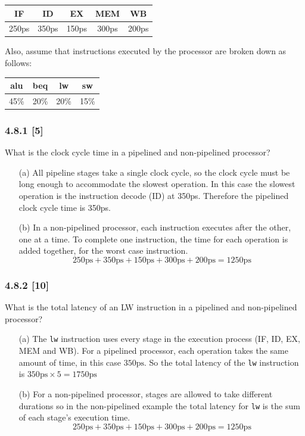 \documentclass[fleqn]{article}
\begin{document}
\begin{table}[H]
    \centering
    \begin{tabular}{|c|c|c|c|c|}
    \hline
    \rowcolor[HTML]{79bde8} 
    IF & ID & EX & MEM & WB \\ \hline \hline
    250ps & 350ps & 150ps & 300ps & 200ps \\ \hline
    \end{tabular}
\end{table}

Also, assume that instructions executed by the processor are broken down as follows:
\begin{table}[H]
    \centering
    \begin{tabular}{|c|c|c|c|}
    \hline
    \rowcolor[HTML]{79bde8} 
    alu & beq & lw & sw  \\ \hline \hline
    45\% & 20\% & 20\% & 15\% \\ \hline
    \end{tabular}
\end{table}
\subsubsection*{4.8.1 [5] \textrangle} What is the clock cycle time in a pipelined and non-pipelined processor?
\begin{itemize}
    \item[(a)] All pipeline stages take a single clock cycle, so the clock cycle must be long enough to accommodate the slowest operation. In this case the slowest operation is the instruction decode (ID) at 350ps. Therefore the pipelined clock cycle time is 350ps.
    \item[(b)] In a non-pipelined processor, each instruction executes after the other, one at a time. To complete one instruction, the time for each operation is added together, for the worst case instruction. \[250\text{ps} + 350\text{ps} + 150\text{ps} + 300\text{ps} + 200\text{ps} = 1250\text{ps}\] 
\end{itemize}

\subsubsection*{4.8.2 [10] \textrangle} What is the total latency of an LW instruction in a pipelined and non-pipelined processor?
\begin{itemize}
    \item[(a)] The \verb|lw| instruction uses every stage in the execution process (IF, ID, EX, MEM and WB). For a pipelined processor, each operation takes the same amount of time, in this case $350\text{ps}$. So the total latency of the \verb|lw| instruction is $350\text{ps} \times 5 = 1750\text{ps}$
    \item[(b)] For a non-pipelined processor, stages are allowed to take different durations so in the non-pipelined example the total latency for \verb|lw| is the sum of each stage's execution time.  \[250\text{ps} + 350\text{ps} + 150\text{ps} + 300\text{ps} + 200\text{ps} = 1250\text{ps}\] 
\end{itemize}
\vspace{0.125in}
\end{document}
